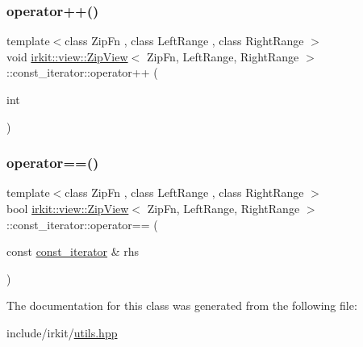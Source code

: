\subsubsection{\texorpdfstring{operator++()}{operator++()}\hspace{0.1cm}{\footnotesize\ttfamily [2/2]}}
{\footnotesize\ttfamily template$<$class Zip\+Fn , class Left\+Range , class Right\+Range $>$ \\
void \hyperlink{classirkit_1_1view_1_1ZipView}{irkit\+::view\+::\+Zip\+View}$<$ Zip\+Fn, Left\+Range, Right\+Range $>$\+::const\+\_\+iterator\+::operator++ (\begin{DoxyParamCaption}\item[{int}]{ }\end{DoxyParamCaption})\hspace{0.3cm}{\ttfamily [inline]}}

\mbox{\label{classirkit_1_1view_1_1ZipView_1_1const__iterator_ae22d91fa97683693b45408ca06c3a5a8}} 
\subsubsection{\texorpdfstring{operator==()}{operator==()}}
{\footnotesize\ttfamily template$<$class Zip\+Fn , class Left\+Range , class Right\+Range $>$ \\
bool \hyperlink{classirkit_1_1view_1_1ZipView}{irkit\+::view\+::\+Zip\+View}$<$ Zip\+Fn, Left\+Range, Right\+Range $>$\+::const\+\_\+iterator\+::operator== (\begin{DoxyParamCaption}\item[{const \hyperlink{classirkit_1_1view_1_1ZipView_1_1const__iterator}{const\+\_\+iterator} \&}]{rhs }\end{DoxyParamCaption})\hspace{0.3cm}{\ttfamily [inline]}}



The documentation for this class was generated from the following file\+:\begin{DoxyCompactItemize}
\item 
include/irkit/\hyperlink{utils_8hpp}{utils.\+hpp}\end{DoxyCompactItemize}
